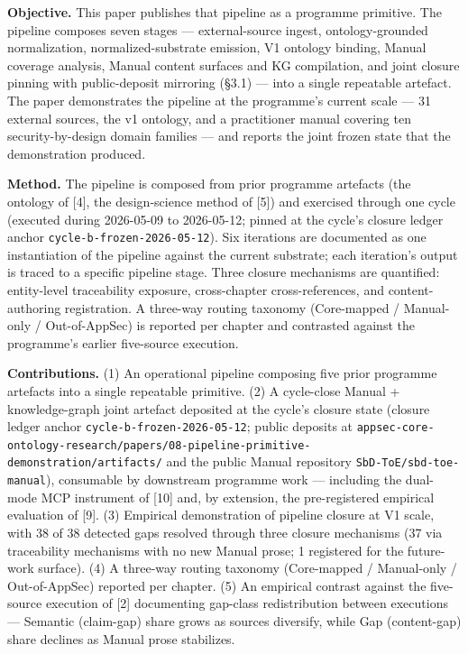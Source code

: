 \documentclass[
]{article}
\begin{document}
\textbf{Objective.} This paper publishes that pipeline as a programme
primitive. The pipeline composes seven stages --- external-source
ingest, ontology-grounded normalization, normalized-substrate emission,
V1 ontology binding, Manual coverage analysis, Manual content surfaces
and KG compilation, and joint closure pinning with public-deposit
mirroring (§3.1) --- into a single repeatable artefact. The paper
demonstrates the pipeline at the programme's current scale --- 31
external sources, the v1 ontology, and a practitioner manual covering
ten security-by-design domain families --- and reports the joint frozen
state that the demonstration produced.

\textbf{Method.} The pipeline is composed from prior programme artefacts
(the ontology of {[}4{]}, the design-science method of {[}5{]}) and
exercised through one cycle (executed during 2026-05-09 to 2026-05-12;
pinned at the cycle's closure ledger anchor
\texttt{cycle-b-frozen-2026-05-12}). Six iterations are documented as
one instantiation of the pipeline against the current substrate; each
iteration's output is traced to a specific pipeline stage. Three closure
mechanisms are quantified: entity-level traceability exposure,
cross-chapter cross-references, and content-authoring registration. A
three-way routing taxonomy (Core-mapped / Manual-only / Out-of-AppSec)
is reported per chapter and contrasted against the programme's earlier
five-source execution.

\textbf{Contributions.} (1) An operational pipeline composing five prior
programme artefacts into a single repeatable primitive. (2) A
cycle-close Manual + knowledge-graph joint artefact deposited at the
cycle's closure state (closure ledger anchor
\texttt{cycle-b-frozen-2026-05-12}; public deposits at
\texttt{appsec-core-ontology-research/papers/08-pipeline-primitive-demonstration/artifacts/}
and the public Manual repository \texttt{SbD-ToE/sbd-toe-manual}),
consumable by downstream programme work --- including the dual-mode MCP
instrument of {[}10{]} and, by extension, the pre-registered empirical
evaluation of {[}9{]}. (3) Empirical demonstration of pipeline closure
at V1 scale, with 38 of 38 detected gaps resolved through three closure
mechanisms (37 via traceability mechanisms with no new Manual prose; 1
registered for the future-work surface). (4) A three-way routing
taxonomy (Core-mapped / Manual-only / Out-of-AppSec) reported per
chapter. (5) An empirical contrast against the five-source execution of
{[}2{]} documenting gap-class redistribution between executions ---
Semantic (claim-gap) share grows as sources diversify, while Gap
(content-gap) share declines as Manual prose stabilizes.
\end{document}
